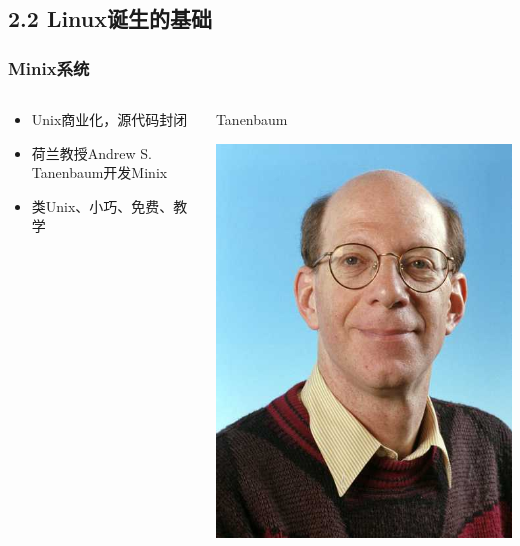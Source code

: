 \documentclass[xcolor=svgnames,presentation]{beamer}
\begin{document}
\subsection{2.2 Linux诞生的基础}
\label{sec-2-2}
\begin{frame}
\frametitle{Minix系统}
\label{sec-2-2-1}
\begin{columns}
\begin{column}{0.6\textwidth}
\label{sec-2-2-1-1}
\begin{itemize}

\item Unix商业化，源代码封闭
\label{sec-2-2-1-2}%

\item 荷兰教授Andrew S. Tanenbaum开发Minix
\label{sec-2-2-1-3}%

\item 类Unix、小巧、免费、教学
\label{sec-2-2-1-4}%
\end{itemize} %
\end{column}
\begin{column}{0.4\textwidth}
\begin{exampleblock}{Tanenbaum}
\label{sec-2-2-1-5}

\includegraphics[width=1\textwidth]{img/ast.jpg}
\end{exampleblock}
\end{column}
\end{columns}
\end{frame}
\end{document}
